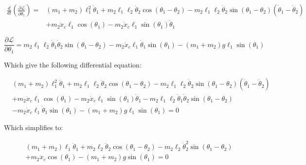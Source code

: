 \documentclass[10pt]{article}
\begin{document}
    \begin{equation} \label{eq: lagrange Step2}
        \begin{aligned}
        \frac{d}{dt} \left(\frac{\partial \mathcal{L}}{\partial \dot\theta_1}\right) =& 
         (m_1 + m_2)\ell_1^2\ddot\theta_1   +   m_2\ell_1\ell_2\ddot\theta_2\cos(\theta_1 - \theta_2)  -m_2\ell_1\ell_2\dot\theta_2\sin(\theta_1-\theta_2)(\dot\theta_1 - \dot\theta_2) \\
           & +   m_2\ddot x_c\ell_1\cos(\theta_1) - m_2 \dot x_c\ell_1\sin(\theta_1)\dot\theta_1
        \end{aligned}
    \end{equation}

    
    \begin{equation} \label{eq: lagrange Step3}
        \frac{\partial \mathcal{L}}{\partial\theta_1} = 
        m_2\ell_1\ell_2\dot\theta_1\dot\theta_2\sin(\theta_1-\theta_2) 
        -m_2\dot x_c\ell_1\dot\theta_1\sin(\theta_1)
        - (m_1 + m_2)g\ell_1\sin(\theta_1)
    \end{equation}

    Which give the following differential equation:

    \begin{equation}
        \begin{aligned}
            &(m_1 + m_2)\ell_1^2\ddot\theta_1   +   m_2\ell_1\ell_2\ddot\theta_2\cos(\theta_1 - \theta_2)  -m_2\ell_1\ell_2\dot\theta_2\sin(\theta_1-\theta_2)(\dot\theta_1 - \dot\theta_2)\\
            &+   m_2\ddot x_c\ell_1\cos(\theta_1) - m_2 \dot x_c\ell_1\sin(\theta_1)\dot\theta_1 - m_2\ell_1\ell_2\dot\theta_1\dot\theta_2\sin(\theta_1-\theta_2)\\ 
            &-m_2\dot x_c\ell_1\dot\theta_1\sin(\theta_1) - (m_1 + m_2)g\ell_1\sin(\theta_1) = 0
        \end{aligned}
    \end{equation}   


    Which simplifies to:

    \begin{equation}
        \begin{aligned}
            &(m_1 + m_2)\ell_1\ddot\theta_1   +   m_2\ell_2\ddot\theta_2\cos(\theta_1 - \theta_2)  -m_2\ell_2\dot\theta_2^2\sin(\theta_1-\theta_2)\\
            &+   m_2\ddot x_c\cos(\theta_1) - (m_1 + m_2)g\sin(\theta_1) = 0
        \end{aligned}
    \end{equation}  
\end{document}
